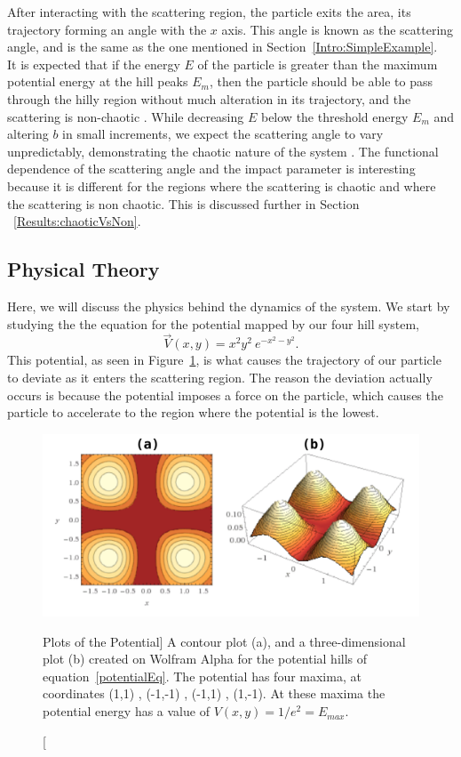 \documentclass[12pt]{article} %
\begin{document}
 
 After interacting with the scattering region, the particle exits the area, its trajectory forming an angle with the $x$ axis. This angle is known as the scattering angle, and is the same as the one mentioned in Section~\ref{Intro:SimpleExample}.\\

It is expected that if the energy $E$ of the particle is greater than the maximum potential energy at the hill peaks $E_m$, then the particle should be able to pass through the hilly region without much alteration in its trajectory, and the scattering is non-chaotic \cite{GRice}. While decreasing $E$ below the threshold energy $E_m$ and altering $b$ in small increments, we expect the scattering angle to vary unpredictably, demonstrating the chaotic nature of the system \cite{GRice}. The functional dependence of the scattering angle and the impact parameter is interesting because it is different for the regions where the scattering is chaotic and where the scattering is non chaotic. This is discussed further in Section ~\ref{Results:chaoticVsNon}.\\





\subsection{Physical Theory}


Here, we will discuss the physics behind the dynamics of the system. We start by studying the the equation for the potential mapped by our four hill system, 
\begin{equation} \label{potentialEq}
\vec{V}(x,y) = x^2 y^2 \ e^ {-x^2-y^2}.
\end{equation}
\noindent This potential, as seen in Figure~\ref{potHills}, is what causes the trajectory of our particle to deviate as it enters the scattering region. The reason the deviation actually occurs is because the potential imposes a force on the particle, which causes the particle to accelerate to the region where the potential is the lowest.   

\begin{figure}[H]
	\begin{center}
		\includegraphics[width=0.7\linewidth]{potHillsWolfram}
		\caption
		[Plots of the Potential]
		{A contour plot (a), and a three-dimensional plot (b) created on Wolfram Alpha for the potential hills of equation~\ref{potentialEq}. 
			The potential has four maxima, at coordinates (1,1) , (-1,-1) , (-1,1) , (1,-1). At these maxima the potential energy has a value of $V(x,y) = 1/e^2 = E_{max}$.}\label{potHills}
	\end{center}
\end{figure}
\end{document}
